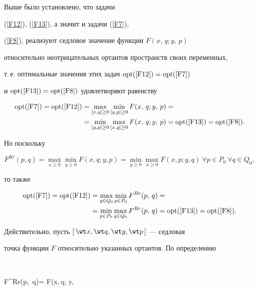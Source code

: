 \begin{pf} Выше было установлено, что задачи


(\ref{F12}), (\ref{F13}), а значит и задачи (\ref{F7}),


(\ref{F8}), реализуют седловое значение функции $F(x,\,q; y,\,p)$


относительно неотрицательных ортантов пространств своих переменных,


т.\,е.{} оптимальные значения этих задач $\operatorname{opt}(\ref{F12})=\operatorname{opt}(\ref{F7})$


и $\operatorname{opt}(\ref{F13})=\operatorname{opt}(\ref{F8})$ удовлетворяют равенству


\begin{align*}


\opt(\ref{F7})=\opt(\ref{F12})& = \max_{[x,q]\ge0}


\min_{[y,p]\ge 0} F(x,\,q; y,\,p) = \\


&= \min_{[y,p]\ge0} \max_{[x,q]\ge 0}


F(x,\,q; y,\,p) = \opt(\ref{F13})=\opt(\ref{F8}).


\end{align*}


Но поскольку


$$


F^{Rr}(p, q)= \max_{x\ge0} \min_{y\ge0} F(x,q;


y,p) = \min_{y\ge 0} \max_{x\ge 0} F(x,p; y,q)


\ \forall p\in P_0\ \forall q\in Q_0,


$$


то также


\begin{align*}


\opt(\ref{F7})=\opt(\ref{F12})& = \max_{q\in Q_0}


\min_{p\in P_0} F^{Rr}(p,\,q) = \\


& =\min_{p\in P_0} \max_{q\in Q_0} F^{Rr}(p,\,q) 


= \opt(\ref{F13})=\opt(\ref{F8}).


\end{align*}


Действительно, пусть $[\,\wt x,\wt q, \wt y, \wt p\,]$ --- седловая


точка функции $F$ относительно указанных ортантов. По определению


$$


F^{Rr}(\wt p,\, \wt q)= F(\wt x,\,\wt q; \wt y,\,



\end{pf}
